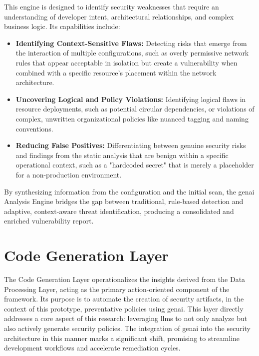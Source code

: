 This engine is designed to identify security weaknesses that require an understanding of developer intent, architectural relationships, and complex business logic\cite{noseevich_towards_2015}. Its capabilities include:

\begin{itemize}
\item \textbf{Identifying Context-Sensitive Flaws:} Detecting risks that emerge from the interaction of multiple configurations, such as overly permissive network rules that appear acceptable in isolation but create a vulnerability when combined with a specific resource's placement within the network architecture\cite{noseevich_towards_2015}.
\item \textbf{Uncovering Logical and Policy Violations:} Identifying logical flaws in resource deployments, such as potential circular dependencies, or violations of complex, unwritten organizational policies like nuanced tagging and naming conventions.
\item \textbf{Reducing False Positives:} Differentiating between genuine security risks and findings from the static analysis that are benign within a specific operational context, such as a "hardcoded secret" that is merely a placeholder for a non-production environment.
\end{itemize}

By synthesizing information from the configuration and the initial scan, the \gls{genai} Analysis Engine bridges the gap between traditional, rule-based detection and adaptive, context-aware threat identification, producing a consolidated and enriched vulnerability report.


\section{Code Generation Layer}
\label{sec:code-generation-layer}

The Code Generation Layer operationalizes the insights derived from the Data Processing Layer, acting as the primary action-oriented component of the framework. Its purpose is to automate the creation of security artifacts, in the context of this prototype, preventative policies using \gls{genai}. This layer directly addresses a core aspect of this research: leveraging \glspl{llm} to not only analyze but also actively generate security policies. The integration of \gls{genai} into the security architecture in this manner marks a significant shift, promising to streamline development workflows and accelerate remediation cycles\cite{kumar_generative_nodate}.

